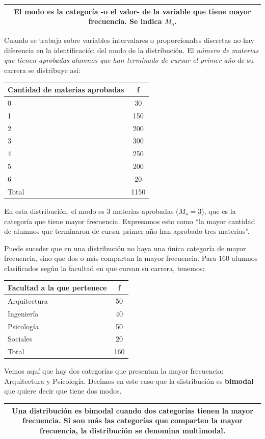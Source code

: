 \documentclass[]{book}
\begin{document}
\begin{longtable}[]{@{}c@{}}
\toprule
\endhead
\begin{minipage}[t]{0.97\columnwidth}\centering
El \textbf{modo} es la categoría -o el valor- de la variable que tiene mayor frecuencia. Se indica \(M_o\).\strut
\end{minipage}\tabularnewline
\bottomrule
\end{longtable}

Cuando se trabaja sobre variables intervalares o proporcionales
discretas no hay diferencia en la identificación del modo de la
distribución. El \emph{número de materias que tienen aprobadas alumnos que han terminado de cursar el primer año} de su carrera se distribuye así:

\begin{longtable}[]{@{}lc@{}}
\toprule
Cantidad de materias aprobadas & f\tabularnewline
\midrule
\endhead
0 & 30\tabularnewline
1 & 150\tabularnewline
2 & 200\tabularnewline
3 & 300\tabularnewline
4 & 250\tabularnewline
5 & 200\tabularnewline
6 & 20\tabularnewline
Total & 1150\tabularnewline
\bottomrule
\end{longtable}

En esta distribución, el modo es 3 materias aprobadas (\(M_o = 3\)), que es la categoría que tiene mayor frecuencia. Expresamos esto como ``la mayor cantidad de alumnos que terminaron de cursar primer año han aprobado tres materias''.

Puede suceder que en una distribución no haya una única categoría de
mayor frecuencia, sino que dos o más compartan la mayor frecuencia. Para 160 alumnos clasificados según la facultad en que cursan su carrera, tenemos:

\begin{longtable}[]{@{}lc@{}}
\toprule
Facultad a la que pertenece & f\tabularnewline
\midrule
\endhead
Arquitectura & 50\tabularnewline
Ingeniería & 40\tabularnewline
Psicología & 50\tabularnewline
Sociales & 20\tabularnewline
Total & 160\tabularnewline
\bottomrule
\end{longtable}

Vemos aquí que hay dos categorías que presentan la mayor frecuencia:
Arquitectura y Psicología. Decimos en este caso que la distribución es \textbf{bimodal} que quiere decir que tiene dos modos.

\begin{longtable}[]{@{}c@{}}
\toprule
\endhead
\begin{minipage}[t]{0.97\columnwidth}\centering
Una distribución es \textbf{bimodal} cuando dos categorías tienen la mayor frecuencia. Si son más las categorías que comparten la mayor frecuencia, la distribución se denomina \textbf{multimodal}.\strut
\end{minipage}\tabularnewline
\bottomrule
\end{longtable}
\end{document}
